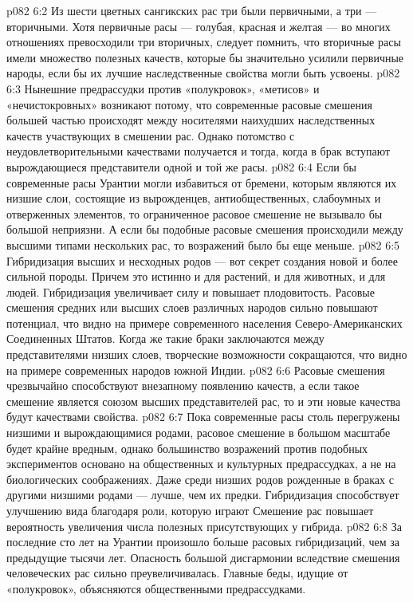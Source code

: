 \vs p082 6:2 Из шести цветных сангикских рас три были первичными, а три --- вторичными. Хотя первичные расы --- голубая, красная и желтая --- во многих отношениях превосходили три вторичных, следует помнить, что вторичные расы имели множество полезных качеств, которые бы значительно усилили первичные народы, если бы их лучшие наследственные свойства могли быть усвоены.
\vs p082 6:3 Нынешние предрассудки против «полукровок», «метисов» и «нечистокровных» возникают потому, что современные расовые смешения большей частью происходят между носителями наихудших наследственных качеств участвующих в смешении рас. Однако потомство с неудовлетворительными качествами получается и тогда, когда в брак вступают вырождающиеся представители одной и той же расы.
\vs p082 6:4 Если бы современные расы Урантии могли избавиться от бремени, которым являются их низшие слои, состоящие из вырожденцев, антиобщественных, слабоумных и отверженных элементов, то ограниченное расовое смешение не вызывало бы большой неприязни. А если бы подобные расовые смешения происходили между высшими типами нескольких рас, то возражений было бы еще меньше.
\vs p082 6:5 Гибридизация высших и несходных родов --- вот секрет создания новой и более сильной породы. Причем это истинно и для растений, и для животных, и для людей. Гибридизация увеличивает силу и повышает плодовитость. Расовые смешения средних или высших слоев различных народов сильно повышают  потенциал, что видно на примере современного населения Северо\hyp{}Американских Соединенных Штатов. Когда же такие браки заключаются между представителями низших слоев, творческие возможности сокращаются, что видно на примере современных народов южной Индии.
\vs p082 6:6 Расовые смешения чрезвычайно способствуют внезапному появлению  качеств, а если такое смешение является союзом высших представителей рас, то и эти новые качества будут качествами  свойства.
\vs p082 6:7 Пока современные расы столь перегружены низшими и вырождающимися родами, расовое смешение в большом масштабе будет крайне вредным, однако большинство возражений против подобных экспериментов основано на общественных и культурных предрассудках, а не на биологических соображениях. Даже среди низших родов рожденные в браках с другими низшими родами --- лучше, чем их предки. Гибридизация способствует улучшению вида благодаря роли, которую играют  Смешение рас повышает вероятность увеличения числа полезных  присутствующих у гибрида.
\vs p082 6:8 \pc За последние сто лет на Урантии произошло больше расовых гибридизаций, чем за предыдущие тысячи лет. Опасность большой дисгармонии вследствие смешения человеческих рас сильно преувеличивалась. Главные беды, идущие от «полукровок», объясняются общественными предрассудками.
